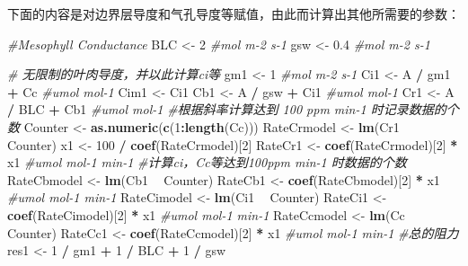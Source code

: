 \documentclass[
]{krantz}
\makeatletter
\newenvironment{Shaded}{\begin{snugshade}}{\end{snugshade}}
\newcommand{\CommentTok}[1]{\textcolor[rgb]{0.56,0.35,0.01}{\textit{#1}}}
\newcommand{\DecValTok}[1]{\textcolor[rgb]{0.00,0.00,0.81}{#1}}
\newcommand{\FloatTok}[1]{\textcolor[rgb]{0.00,0.00,0.81}{#1}}
\newcommand{\KeywordTok}[1]{\textcolor[rgb]{0.13,0.29,0.53}{\textbf{#1}}}
\newcommand{\NormalTok}[1]{#1}
\newcommand{\OperatorTok}[1]{\textcolor[rgb]{0.81,0.36,0.00}{\textbf{#1}}}
\newcommand{\StringTok}[1]{\textcolor[rgb]{0.31,0.60,0.02}{#1}}
\newenvironment{kframe}{%
\medskip{}
\setlength{\fboxsep}{.8em}
 \def\at@end@of@kframe{}%
 \ifinner\ifhmode%
  \def\at@end@of@kframe{\end{minipage}}%
  \begin{minipage}{\columnwidth}%
 \fi\fi%
 \def\FrameCommand##1{\hskip\@totalleftmargin \hskip-\fboxsep
 \colorbox{shadecolor}{##1}\hskip-\fboxsep
     \hskip-\linewidth \hskip-\@totalleftmargin \hskip\columnwidth}%
 \MakeFramed {\advance\hsize-\width
   \@totalleftmargin\z@ \linewidth\hsize
   \@setminipage}}%
 {\par\unskip\endMakeFramed%
 \at@end@of@kframe}
\renewenvironment{Shaded}{\begin{kframe}}{\end{kframe}}
\makeatother
\begin{document}
下面的内容是对边界层导度和气孔导度等赋值，由此而计算出其他所需要的参数：

\begin{Shaded}
\begin{Highlighting}[]
\CommentTok{#Mesophyll Conductance}
\NormalTok{BLC <-}\StringTok{ }\DecValTok{2} \CommentTok{#mol m-2 s-1}
\NormalTok{gsw <-}\StringTok{ }\FloatTok{0.4} \CommentTok{#mol m-2 s-1}

\CommentTok{# 无限制的叶肉导度，并以此计算ci等}
\NormalTok{gm1 <-}\StringTok{ }\DecValTok{1} \CommentTok{#mol m-2 s-1}
\NormalTok{Ci1 <-}\StringTok{ }\NormalTok{A }\OperatorTok{/}\StringTok{ }\NormalTok{gm1 }\OperatorTok{+}\StringTok{ }\NormalTok{Cc }\CommentTok{#umol mol-1}
\NormalTok{Cim1 <-}\StringTok{ }\NormalTok{Ci1}
\NormalTok{Cb1 <-}\StringTok{ }\NormalTok{A }\OperatorTok{/}\StringTok{ }\NormalTok{gsw }\OperatorTok{+}\StringTok{ }\NormalTok{Ci1 }\CommentTok{#umol mol-1}
\NormalTok{Cr1 <-}\StringTok{ }\NormalTok{A }\OperatorTok{/}\StringTok{ }\NormalTok{BLC }\OperatorTok{+}\StringTok{ }\NormalTok{Cb1 }\CommentTok{#umol mol-1}
\CommentTok{#根据斜率计算达到 100 ppm min-1 时记录数据的个数}
\NormalTok{Counter <-}\StringTok{ }\KeywordTok{as.numeric}\NormalTok{(}\KeywordTok{c}\NormalTok{(}\DecValTok{1}\OperatorTok{:}\KeywordTok{length}\NormalTok{(Cc)))}
\NormalTok{RateCrmodel <-}\StringTok{ }\KeywordTok{lm}\NormalTok{(Cr1 }\OperatorTok{~}\StringTok{ }\NormalTok{Counter)}
\NormalTok{x1 <-}\StringTok{ }\DecValTok{100} \OperatorTok{/}\StringTok{ }\KeywordTok{coef}\NormalTok{(RateCrmodel)[}\DecValTok{2}\NormalTok{] }
\NormalTok{RateCr1 <-}\StringTok{ }\KeywordTok{coef}\NormalTok{(RateCrmodel)[}\DecValTok{2}\NormalTok{] }\OperatorTok{*}\StringTok{ }\NormalTok{x1 }\CommentTok{#umol mol-1 min-1}
\CommentTok{#计算ci，Cc等达到100ppm min-1 时数据的个数}
\NormalTok{RateCbmodel <-}\StringTok{ }\KeywordTok{lm}\NormalTok{(Cb1 }\OperatorTok{~}\StringTok{ }\NormalTok{Counter)}
\NormalTok{RateCb1 <-}\StringTok{ }\KeywordTok{coef}\NormalTok{(RateCbmodel)[}\DecValTok{2}\NormalTok{] }\OperatorTok{*}\StringTok{ }\NormalTok{x1 }\CommentTok{#umol mol-1 min-1}
\NormalTok{RateCimodel <-}\StringTok{ }\KeywordTok{lm}\NormalTok{(Ci1 }\OperatorTok{~}\StringTok{ }\NormalTok{Counter)}
\NormalTok{RateCi1 <-}\StringTok{ }\KeywordTok{coef}\NormalTok{(RateCimodel)[}\DecValTok{2}\NormalTok{] }\OperatorTok{*}\StringTok{ }\NormalTok{x1 }\CommentTok{#umol mol-1 min-1}
\NormalTok{RateCcmodel <-}\StringTok{ }\KeywordTok{lm}\NormalTok{(Cc }\OperatorTok{~}\StringTok{ }\NormalTok{Counter)}
\NormalTok{RateCc1 <-}\StringTok{ }\KeywordTok{coef}\NormalTok{(RateCcmodel)[}\DecValTok{2}\NormalTok{] }\OperatorTok{*}\StringTok{ }\NormalTok{x1 }\CommentTok{#umol mol-1 min-1}
\CommentTok{#总的阻力}
\NormalTok{res1 <-}\StringTok{ }\DecValTok{1} \OperatorTok{/}\StringTok{ }\NormalTok{gm1 }\OperatorTok{+}\StringTok{ }\DecValTok{1} \OperatorTok{/}\StringTok{ }\NormalTok{BLC }\OperatorTok{+}\StringTok{ }\DecValTok{1} \OperatorTok{/}\StringTok{ }\NormalTok{gsw}


\end{Highlighting}
\end{Shaded}
\end{document}
